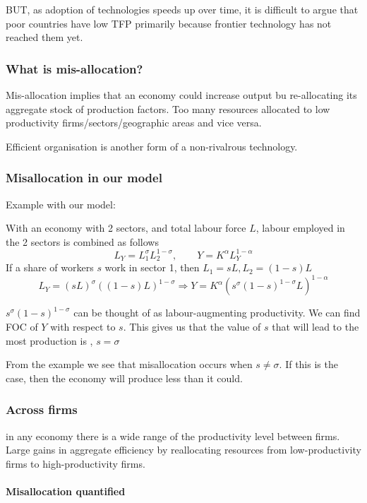 \documentclass[11pt]{article}
\begin{document}
BUT, as adoption of technologies speeds up over time, it is difficult to argue that poor countries have low TFP primarily because frontier technology has not reached them yet.

\subsubsection{What is mis-allocation?}

Mis-allocation implies that an economy could increase output bu re-allocating its aggregate stock of production factors. Too many resources allocated to low productivity firms/sectors/geographic areas and vice versa.

Efficient organisation is another form of a non-rivalrous technology.

\subsubsection{Misallocation in our model}
Example with our model:
\begin{mdframed}
    With an economy with 2 sectors, and total labour force $L$, labour employed in the 2 sectors is combined as follows
    \[L_Y = L_1^\sigma L_2^{1-\sigma}, \qquad Y = K^\alpha L_Y^{1-\alpha}\]
    If a share of workers $s$ work in sector 1, then $L_1 = sL, L_2 = (1-s)L$
    \[L_Y = (sL)^\sigma((1-s)L)^{1-\sigma} \Rightarrow Y = K^\alpha (s^\sigma (1-s)^{1-\sigma}L)^{1-\alpha}\]

    $s^\sigma (1-s)^{1-\sigma}$ can be thought of as labour-augmenting productivity. We can find FOC of $Y$ with respect to $s$. This gives us that the value of $s$ that will lead to the most production is , $s=\sigma$
\end{mdframed}

From the example we see that misallocation occurs when $s\neq\sigma$. If this is the case, then the economy will produce less than it could.

\subsubsection{Across firms}

in any economy there is a wide range of the productivity level between firms. Large gains in aggregate efficiency by reallocating resources from low-productivity firms to high-productivity firms.

\paragraph{Misallocation quantified} \mbox{} \\
\end{document}

